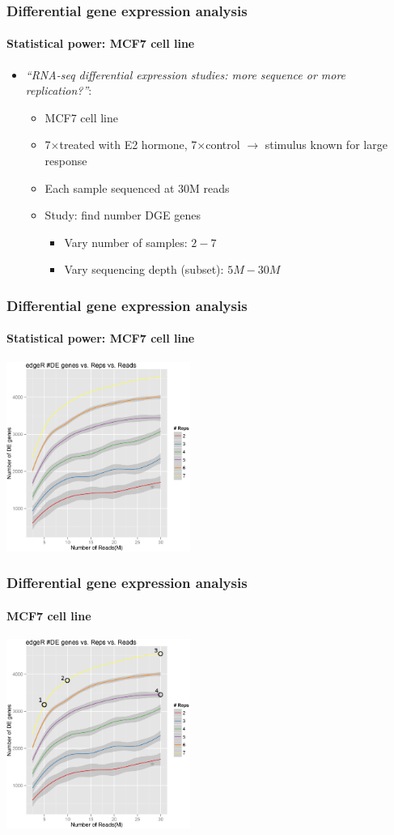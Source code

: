 \documentclass{beamer}			  %
\begin{document}
\begin{frame}
	\frametitle{Differential gene expression analysis}
	\framesubtitle{Statistical power: MCF7 cell line}
	\begin{itemize}
		\item {\scriptsize\textit{``RNA-seq differential expression studies: more sequence or more replication?''}}\cite{mcf7}:
		\begin{itemize}
			\item MCF7 cell line
			\item 7$\times$treated with E2 hormone, 7$\times$control $\rightarrow$ stimulus known for large response
			\item Each sample sequenced at 30M reads
			\item Study: find number DGE genes
			\begin{itemize}
				\item Vary number of samples: $2-7$
				\item Vary sequencing depth (subset): $5M-30M$
			\end{itemize}			
		\end{itemize}
	\end{itemize}
\end{frame}

\begin{frame}
	\frametitle{Differential gene expression analysis}
	\framesubtitle{Statistical power: MCF7 cell line}
	\begin{center}
		\includegraphics[width=0.45\textwidth]{figures/dge_13ap.png}
		\cite{mcf7}
	\end{center}
\end{frame}

\begin{frame}
	\frametitle{Differential gene expression analysis}
	\framesubtitle{MCF7 cell line}
	\begin{center}
		\includegraphics[width=0.45\textwidth]{figures/dge_13bp.png}
		\cite{mcf7}
	\end{center}
\end{frame}
\end{document}
